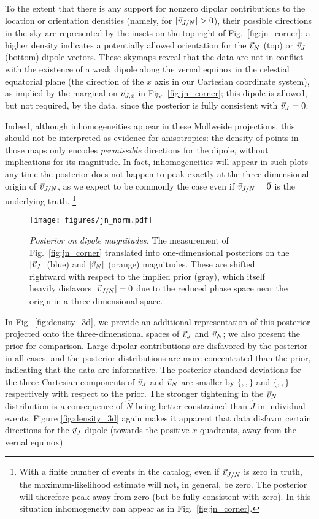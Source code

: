 \documentclass[twocolumn,twocolappendix,linenumbers]{aastex631}
\newcommand{\varimpNx}{}
\newcommand{\varimpNy}{}
\newcommand{\varimpNz}{}
\newcommand{\varimpJx}{}
\newcommand{\varimpJy}{}
\newcommand{\varimpJz}{}
\begin{document}
To the extent that there is any support for nonzero dipolar contributions to the location or orientation densities (namely, for $|\vec{v}_{J/N}| > 0$), their possible directions in the sky are represented by the insets on the top right of Fig.~\ref{fig:jn_corner}: a higher density indicates a potentially allowed orientation for the $\vec{v}_{N}$ (top) or $\vec{v}_{J}$ (bottom) dipole vectors.
These skymaps reveal that the data are not in conflict with the existence of a weak dipole along the vernal equinox in the celestial equatorial plane (the direction of the $x$ axis in our Cartesian coordinate system), as implied by the marginal on $\vec{v}_{J,x}$ in Fig.~\ref{fig:jn_corner}; this dipole is allowed, but not required, by the data, since the posterior is fully consistent with $\vec{v}_{J} = 0$.

Indeed, although inhomogeneities appear in these Mollweide projections, this should not be interpreted as evidence for anisotropies: the density of points in those maps only encodes \emph{permissible} directions for the dipole, without implications for its magnitude.
In fact, inhomogeneities will appear in such plots any time the posterior does not happen to peak exactly at the three-dimensional origin of $\vec{v}_{J/N}$, as we expect to be commonly the case even if $\vec{v}_{J/N}=\vec{0}$ is the underlying truth.%
\footnote{With a finite number of events in the catalog, even if $\vec{v}_{J/N}$ is zero in truth, the maximum-likelihood estimate will not, in general, be zero. The posterior will therefore peak away from zero (but be fully consistent with zero). In this situation inhomogeneity can appear as in Fig.\ \ref{fig:jn_corner}.}

\begin{figure}
\texttt{[image: figures/jn\_norm.pdf]}
\caption{\emph{Posterior on dipole magnitudes.} The measurement of Fig.~\ref{fig:jn_corner} translated into one-dimensional posteriors on the $|\vec{v}_{J}|$ (blue) and $|\vec{v}_{N}|$ (orange) magnitudes.
These are shifted rightward with respect to the implied prior (gray), which itself heavily disfavors $|\vec{v}_{J/N}|=0$ due to the reduced phase space near the origin in a three-dimensional space.
}
\label{fig:jn_norm}
\end{figure}

In Fig.~\ref{fig:density_3d}, we provide an additional representation of this posterior projected onto the three-dimensional spaces of $\vec{v}_{J}$ and $\vec{v}_{N}$; we also present the prior for comparison.
Large dipolar contributions are disfavored by the posterior in all cases, and the posterior distributions are more concentrated than the prior, indicating that the data are informative.
The posterior standard deviations for the three Cartesian components of $\vec{v}_{J}$ and $\vec{v}_{N}$ are smaller by $\{\varimpJx, \varimpJy, \varimpJz\}$ and $\{\varimpNx, \varimpNy, \varimpNz\}$ respectively with respect to the prior.
The stronger tightening in the $\vec{v}_{N}$ distribution is a consequence of $\hat{N}$ being better constrained than $\hat{J}$ in individual events.
Figure \ref{fig:density_3d} again makes it apparent that data disfavor certain directions for the $\vec{v}_{J}$ dipole (towards the positive-$x$ quadrants, away from the vernal equinox).
\end{document}
